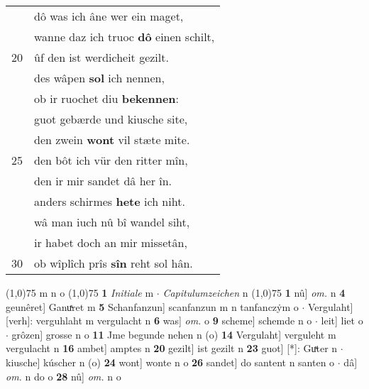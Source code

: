 \documentclass[8pt,a4paper,notitlepage]{article}
\begin{document}
\begin{table}[ht]
\begin{minipage}[t]{0.5\linewidth}
\begin{tabular}{rl}
 & dô was ich âne wer ein maget,\\ 
 & wanne daz ich truoc \textbf{dô} einen schilt,\\ 
20 & ûf den ist werdicheit gezilt.\\ 
 & des wâpen \textbf{sol} ich nennen,\\ 
 & ob ir ruochet diu \textbf{bekennen}:\\ 
 & guot gebærde und kiusche site,\\ 
 & den zwein \textbf{wont} vil stæte mite.\\ 
25 & den bôt ich vür den ritter mîn,\\ 
 & den ir mir sandet dâ her în.\\ 
 & anders schirmes \textbf{hete} ich niht.\\ 
 & wâ man iuch nû bî wandel siht,\\ 
 & ir habet doch an mir missetân,\\ 
30 & ob wîplîch prîs \textbf{sîn} reht sol hân.\\ 
\end{tabular}
\scriptsize
\line(1,0){75} \newline
m n o \newline
\line(1,0){75} \newline
\textbf{1} \textit{Initiale} m   $\cdot$ \textit{Capitulumzeichen} n  \newline
\line(1,0){75} \newline
\textbf{1} nû] \textit{om.} n \textbf{4} geunêret] Ganuͯret m \textbf{5} Schanfanzun] scanfanzun m n tanfanczẏm o  $\cdot$ Vergulaht] [verh]: verguhlaht m vergulacht n \textbf{6} was] \textit{om.} o \textbf{9} scheme] schemde n o  $\cdot$ leit] liet o  $\cdot$ grôzen] grosse n o \textbf{11} Jme begunde nehen n (o) \textbf{14} Vergulaht] verguleht m vergulacht n \textbf{16} ambet] amptes n \textbf{20} gezilt] ist gezilt n \textbf{23} guot] [*]: Guͯter n  $\cdot$ kiusche] kúscher n (o) \textbf{24} wont] wonte n o \textbf{26} sandet] do santent n santen o  $\cdot$ dâ] \textit{om.} n do o \textbf{28} nû] \textit{om.} n o \newline
\end{minipage}
\end{table}
\newpage
\end{document}
